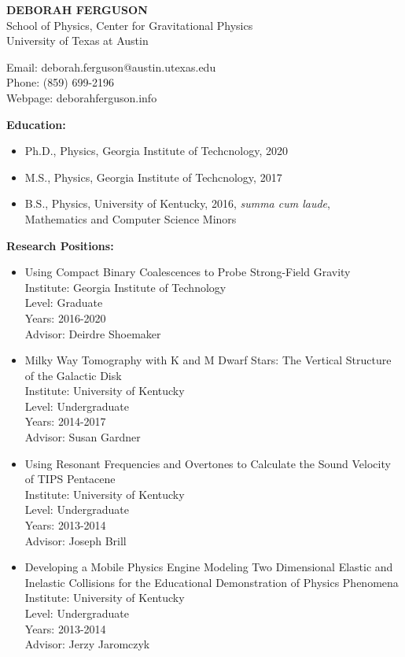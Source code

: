 \documentclass[11pt]{article}
\begin{document}
%	
\begin{center}
  \textbf{DEBORAH FERGUSON}\\
  School of Physics, Center for Gravitational Physics\\
  University of Texas at Austin\\
\end{center}  

\begin{flushleft}

  Email: deborah.ferguson@austin.utexas.edu\\
  Phone: (859) 699-2196\\
  Webpage: deborahferguson.info\\
  \vspace{8px}
  
  \textbf{Education:}
  \begin{itemize}
  \item Ph.D., Physics, Georgia Institute of Techcnology, 2020
  \item M.S., Physics, Georgia Institute of Techcnology, 2017
  \item B.S., Physics, University of Kentucky, 2016, \textit{summa cum laude}, \\ Mathematics and Computer Science Minors
  \end{itemize}

  \textbf{Research Positions:}
  \begin{itemize}
  \item Using Compact Binary Coalescences to Probe Strong-Field Gravity \\
    Institute: Georgia Institute of Technology \\
    Level: Graduate \\
    Years: 2016-2020 \\
    Advisor: Deirdre Shoemaker 
  \item Milky Way Tomography with K and M Dwarf Stars: The Vertical Structure of the Galactic Disk \\
    Institute: University of Kentucky \\
    Level: Undergraduate \\
    Years: 2014-2017 \\
    Advisor: Susan Gardner
  \item Using Resonant Frequencies and Overtones to Calculate the Sound Velocity of TIPS Pentacene \\
    Institute: University of Kentucky \\
    Level: Undergraduate \\
    Years: 2013-2014 \\
    Advisor: Joseph Brill
  \item Developing a Mobile Physics Engine Modeling Two Dimensional Elastic and Inelastic Collisions for the Educational Demonstration of Physics Phenomena \\
    Institute: University of Kentucky \\
    Level: Undergraduate \\
    Years: 2013-2014 \\
    Advisor: Jerzy Jaromczyk 
  \end{itemize}


\end{flushleft}
\end{document}
